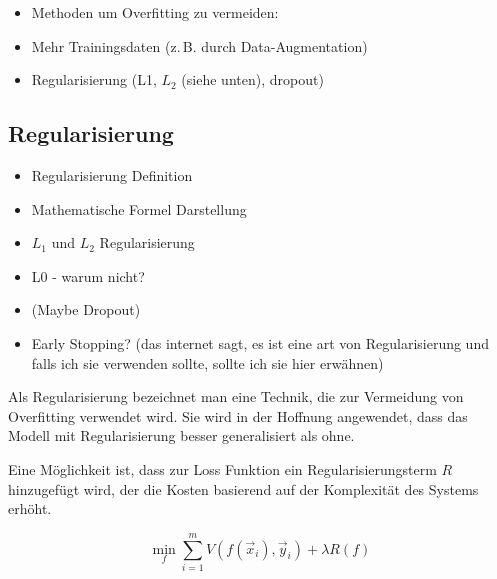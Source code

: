 \color{blue}
\begin{itemize}
	\item Methoden um Overfitting zu vermeiden:
	\item Mehr Trainingsdaten (z.\,B. durch Data-Augmentation)
	\item Regularisierung (L1, \(L_2\) (siehe unten), dropout)
\end{itemize}
\color{black}

\subsection{Regularisierung} \label{ssec:Regul}

\color{blue}
\begin{itemize}
	\item Regularisierung Definition
	\item Mathematische Formel Darstellung
	\item \(L_1\) und \(L_2\) Regularisierung
	\item L0 - warum nicht?
	\item (Maybe Dropout)
	\item Early Stopping? (das internet sagt, es ist eine art von Regularisierung und falls ich sie verwenden sollte, sollte ich sie hier erwähnen)
\end{itemize}
\color{black}

Als Regularisierung bezeichnet man eine Technik, die zur Vermeidung von Overfitting verwendet wird.
Sie wird in der Hoffnung angewendet, dass das Modell mit Regularisierung besser generalisiert als ohne.

Eine Möglichkeit ist, dass zur Loss Funktion ein Regularisierungsterm \(R\) hinzugefügt wird, 
der die Kosten basierend auf der Komplexität des Systems erhöht.

\begin{equation}
	\min_f \sum\limits_{i=1}^{m} V(f(\vec{x}_i), \vec{y}_i) + \lambda R(f)
\end{equation} 

